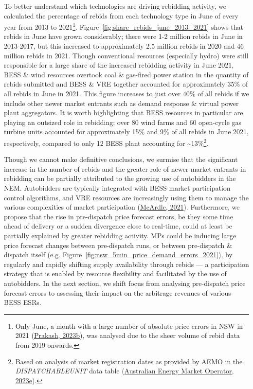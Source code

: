 \documentclass[12pt,a4paper,]{report}
\begin{document}
To better understand which technologies are driving rebidding activity,
we calculated the percentage of rebids from each technology type in June
of every year from 2013 to 2021\footnote{Only June, a month with a large
  number of absolute price errors in NSW in 2021
  (\protect\hyperlink{ref-prakashEnergyPriceConvergence2023}{Prakash,
  2023b}), was analysed due to the sheer volume of rebid data from 2019
  onwards.}. Figure~\ref{fig:share_rebids_june_2013_2021} shows that
rebids in June have grown considerably; there were 1-2 million rebids in
June in 2013-2017, but this increased to approximately 2.5 million
rebids in 2020 and 46 million rebids in 2021. Though conventional
resources (especially hydro) were still responsible for a large share of
the increased rebidding activity in June 2021, BESS \& wind resources
overtook coal \& gas-fired power station in the quantity of rebids
submitted and BESS \& VRE together accounted for approximately 35\% of
all rebids in June in 2021. This figure increases to just over 40\% of
all rebids if we include other newer market entrants such as demand
response \& virtual power plant aggregators. It is worth highlighting
that BESS resources in particular are playing an outsized role in
rebidding; over 80 wind farms and 60 open-cycle gas turbine units
accounted for approximately 15\% and 9\% of all rebids in June 2021,
respectively, compared to only 12 BESS plant accounting for
\textasciitilde13\%\footnote{Based on analysis of market registration
  dates as provided by AEMO in the \emph{DISPATCHABLEUNIT} data table
  (\protect\hyperlink{ref-australianenergymarketoperatorMMSDataModel2023}{Australian
  Energy Market Operator, 2023e}).}.

Though we cannot make definitive conclusions, we surmise that the
significant increase in the number of rebids and the greater role of
newer market entrants in rebidding can be partially attributed to the
growing use of autobidders in the NEM. Autobidders are typically
integrated with BESS market participation control algorithms, and VRE
resources are increasingly using them to manage the various complexities
of market participation
(\protect\hyperlink{ref-mcardleRiseAutobidder2021}{McArdle, 2021}).
Furthermore, we propose that the rise in pre-dispatch price forecast
errors, be they some time ahead of delivery or a sudden divergence close
to real-time, could at least be partially explained by greater rebidding
activity. MPs could be inducing large price forecast changes between
pre-dispatch runs, or between pre-dispatch \& dispatch itself (e.g.
Figure~\ref{fig:nsw_5min_price_demand_errors_2021}), by regularly and
rapidly shifting supply availability through rebids --- a participation
strategy that is enabled by resource flexibility and facilitated by the
use of autobidders. In the next section, we shift focus from analysing
pre-dispatch price forecast errors to assessing their impact on the
arbitrage revenues of various BESS ESRs.
\end{document}
